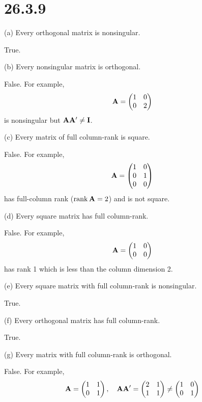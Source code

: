 \section*{26.3.9}
(a) Every orthogonal matrix is nonsingular.

\bigskip
\noindent
True.

\bigskip
\noindent
(b) Every nonsingular matrix is orthogonal.

\bigskip
\noindent
False. For example,
$${\bf A}=\left(\begin{matrix}
1 & 0\cr
0 & 2
\end{matrix}\right)
$$
is nonsingular but ${\bf A}{\bf A}'\ne{\bf I}$.

\bigskip
\noindent
(c) Every matrix of full column-rank is square.

\bigskip
\noindent
False. For example,
$${\bf A}=\left(\begin{matrix}
1 & 0\cr
0 & 1\cr
0 & 0
\end{matrix}\right)$$
has full-column rank ($\mathop{\rm rank}{\bf A}=2$) and is not square.

\bigskip
\noindent
(d) Every square matrix has full column-rank.

\bigskip
\noindent
False. For example,
$${\bf A}=\left(\begin{matrix}
1 & 0\cr
0 & 0
\end{matrix}\right)
$$
has rank 1 which is less than the column dimension 2.

\bigskip
\noindent
(e) Every square matrix with full column-rank is nonsingular.

\bigskip
\noindent
True.

\bigskip
\noindent
(f) Every orthogonal matrix has full column-rank.

\bigskip
\noindent
True.

\bigskip
\noindent
(g) Every matrix with full column-rank is orthogonal.

\bigskip
\noindent
False. For example,
$${\bf A}=\left(\begin{matrix}1 & 1\cr0 & 1\end{matrix}\right),\quad
{\bf AA}'=\left(\begin{matrix}2 & 1\cr1 & 1\end{matrix}\right)\ne
\left(\begin{matrix}1 & 0\cr0 & 1\end{matrix}\right)
$$

